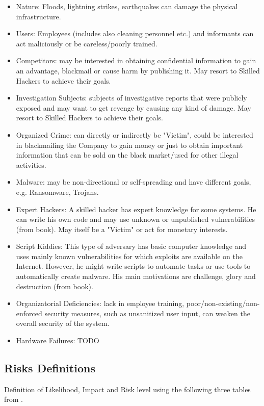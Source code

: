 \documentclass[english]{article}
\begin{document}
\begin{itemize}
\item Nature: Floods, lightning strikes, earthquakes can damage the physical infrastructure.
\item Users: Employees (includes also cleaning personnel etc.) and informants can act maliciously or be careless/poorly trained.
\item Competitors: may be interested in obtaining confidential information to gain an advantage, blackmail or cause harm by publishing it. May resort to Skilled Hackers to achieve their goals.
\item Investigation Subjects: subjects of investigative reports that were publicly exposed and may want to get revenge by causing any kind of damage. May resort to Skilled Hackers to achieve their goals.
\item Organized Crime: can directly or indirectly be "Victim", could be interested in blackmailing the Company to gain money or just to obtain important information that can be sold on the black market/used for other illegal activities.
\item Malware: may be non-directional or self-spreading and have different goals, e.g. Ransomware, Trojans.
\item Expert Hackers: A skilled hacker has expert knowledge for some systems. He can write his own code and may use unknown or unpublished vulnerabilities (from book). May itself be a "Victim" or act for monetary interests.
\item Script Kiddies: This type of adversary has basic computer knowledge and uses mainly known vulnerabilities for which exploits are available on the Internet. However, he might write scripts to automate tasks or use tools to automatically create malware. His main motivations are challenge, glory and destruction (from book).
\item Organizatorial Deficiencies: lack in employee training, poor/non-existing/non-enforced security measures, such as unsanitized user input, can weaken the overall security of the system.
\item Hardware Failures: TODO
\end{itemize}

\subsection{Risks Definitions}

Definition of Likelihood, Impact and Risk level using the following three
  tables from \cite{ASL_book}.
\end{document}
